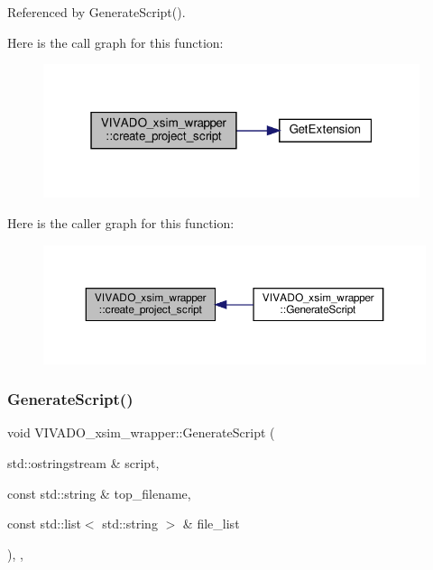 Referenced by Generate\+Script().

Here is the call graph for this function\+:
\nopagebreak
\begin{figure}[H]
\begin{center}
\leavevmode
\includegraphics[width=313pt]{d9/d77/classVIVADO__xsim__wrapper_af41bba7dc3aace458c6626fbd0e1bc04_cgraph}
\end{center}
\end{figure}
Here is the caller graph for this function\+:
\nopagebreak
\begin{figure}[H]
\begin{center}
\leavevmode
\includegraphics[width=350pt]{d9/d77/classVIVADO__xsim__wrapper_af41bba7dc3aace458c6626fbd0e1bc04_icgraph}
\end{center}
\end{figure}
\mbox{\label{classVIVADO__xsim__wrapper_adc04b335afab76135cd6b33997db4203}} 
\subsubsection{\texorpdfstring{Generate\+Script()}{GenerateScript()}}
{\footnotesize\ttfamily void V\+I\+V\+A\+D\+O\+\_\+xsim\+\_\+wrapper\+::\+Generate\+Script (\begin{DoxyParamCaption}\item[{std\+::ostringstream \&}]{script,  }\item[{const std\+::string \&}]{top\+\_\+filename,  }\item[{const std\+::list$<$ std\+::string $>$ \&}]{file\+\_\+list }\end{DoxyParamCaption})\hspace{0.3cm}{\ttfamily [override]}, {\ttfamily [private]}, {\ttfamily [virtual]}}



